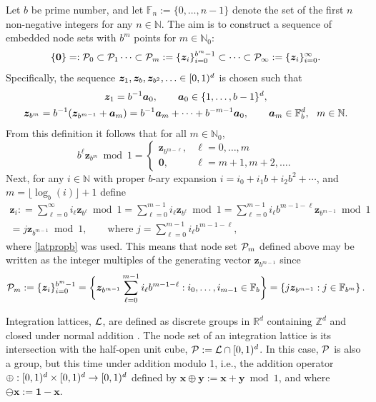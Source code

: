 \documentclass[graybox]{svmult}
\newcommand{\Z}{\mathbb{Z}} %
\newcommand{\R}{\mathbb{R}} %
\newcommand{\N}{\mathbb{N}} %
\newcommand{\F}{\mathbb{F}} %
\newcommand{\bszero}{\boldsymbol{0}} %
\newcommand{\bsone}{\boldsymbol{1}}  %
\newcommand{\bsx}{\boldsymbol{x}}    %
\newcommand{\bsy}{\boldsymbol{y}}    %
\newcommand{\bsz}{\boldsymbol{z}}    %
\begin{document}
Let $b$ be prime number, and let $\F_{n}:=\{0, \ldots, n-1\}$ denote the set of the first $n$ non-negative integers for any $n \in \N$. The aim is to construct a sequence of embedded node sets with $b^m$ points for $m \in \N_0$:
\[
\{\bszero\}=:\cp_0\subset \cp_1 \dots\subset\cp_m:=\{\bsz_i\}_{i=0}^{b^m-1} \subset\dots\subset\cp_\infty:=\{\bsz_i\}_{i=0}^{\infty}.
\]
Specifically, the sequence $\bsz_1, \bsz_b, \bsz_{b^2},  \ldots \in \cube$ is chosen such that 
\begin{subequations} \label{zbmdef}
\begin{gather} 
\bsz_1 = b^{-1} \bsa_0, \qquad \bsa_0 \in \{1, \ldots, b-1\}^{d}, \\
\bsz_{b^m} = b^{-1}(\bsz_{b^{m-1}}+\bsa_m)= b^{-1}\bsa_m + \cdots + b^{-m-1} \bsa_0, \qquad \bsa_m \in \F_b^{d}, \ \ m \in \N.
\end{gather}
\end{subequations}
From this definition it follows that for all $m \in \N_0$,
\begin{equation} 
b^\ell\bsz_{b^m} \bmod {1} = \begin{cases} \bsz_{b^{m-\ell}}, & \ell=0, \ldots, m \\
\bszero, & \ell=m+1, m+2, \ldots .
\end{cases}
\label{latpropb}
\end{equation}
Next, for any $i \in \N$ with proper $b$-ary expansion $i=i_0+i_1 b + i_2 b^2 + \cdots$, and $m=\lfloor \log_b(i) \rfloor+1$ define 
\begin{multline} \label{zidef}
\bsz_i : = \sum_{\ell=0}^{\infty} i_\ell \bsz_{b^\ell} \bmod 1 = \sum_{\ell=0}^{m-1} i_\ell \bsz_{b^\ell} \bmod 1 = \sum_{\ell=0}^{m-1} i_\ell b^{m-1-\ell}  \bsz_{b^{m-1}} \bmod 1 \\ 
 = j \bsz_{b^{m-1}} \bmod 1, \qquad \text{where } j= \sum_{\ell=0}^{m-1} i_\ell b^{m-1-\ell},
\end{multline}
where \eqref{latpropb} was used.  This means that node set $\mathcal{P}_m$ defined above may be written as the integer multiples of the generating vector $\bsz_{b^{m-1}}$ since 
\[
\cp_m:= \{\bsz_i\}_{i=0}^{b^m-1} = \bigg \{ \bsz_{b^{m-1}} \sum_{\ell=0}^{m-1} i_\ell b^{m-1-\ell} : i_0, \ldots , i_{m-1} \in \F_b \bigg \} = \left\{ j \bsz_{b^{m-1}} : j \in \F_{b^m} \right \}.
\]

Integration lattices, $\mathcal{L}$, are defined as discrete groups in $\R^d$ containing $\Z^d$ and closed under normal addition \cite[Sec. 2.7-2.8]{SloJoe94}.  The node set of an integration lattice is its intersection with the half-open unit cube, $\mathcal{P}:=\mathcal{L} \cap [0,1)^d$. In this case, $\mathcal{P}$ is also a group, but this time under addition modulo 1, i.e., the addition operator $\oplus:[0,1)^d \times [0,1)^d \to [0,1)^d$ defined by $\bsx\oplus\bsy:=\bsx+\bsy\bmod 1$, and where $\ominus \bsx:=\bsone-\bsx$.
\end{document}
